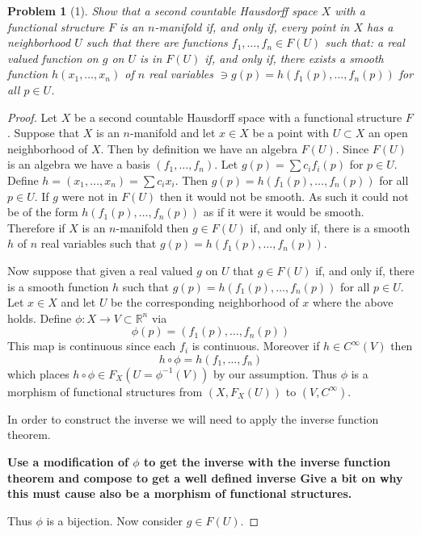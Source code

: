 \documentclass[10pt]{article}
\newcommand{\bb}[1]{\mathbb{#1}}
\theoremstyle{plain}
\newtheorem{problem}{Problem}
\theoremstyle{remark}
\begin{document}
\begin{problem}[1]
  Show that a second countable Hausdorff space $X$ with a functional
  structure $F$ is an $n$-manifold if, and only if, every point in
  $X$ has a neighborhood $U$ such that there are functions
  $f_1,\ldots,f_n\in F(U)$ such that: a real valued function on $g$
  on $U$ is in $F(U)$ if, and only if, there exists a smooth function
  $h(x_1,\ldots,x_n)$ of $n$ real variables $\ni g(p)=h(f_1(p),\ldots,f_n(p))$
  for all $p\in U$.
\end{problem}

\begin{proof}
  Let $X$ be a second countable Hausdorff space with a functional
  structure $F$. Suppose that $X$ is an $n$-manifold and let
  $x\in X$ be a point with $U\subset X$ an open neighborhood of $X$.
  Then by definition we have an algebra $F(U)$. Since $F(U)$
  is an algebra we have a basis $(f_1,\ldots,f_n)$. Let
  $g(p)=\sum c_if_i(p)$ for $p\in U$. Define $h=(x_1,\ldots,x_n)=\sum c_ix_i$.
  Then $g(p)=h(f_1(p),\ldots,f_n(p))$ for all $p\in U$. If $g$ were
  not in $F(U)$ then it would not be smooth. As such it could
  not be of the form $h(f_1(p),\ldots,f_n(p))$ as if it were it
  would be smooth. Therefore if $X$ is an $n$-manifold
  then $g\in F(U)$ if, and only if, there is a smooth $h$ of $n$ real
  variables such that $g(p)=h(f_1(p),\ldots,f_n(p))$. 

  Now suppose that given a real valued $g$ on $U$ that $g\in F(U)$
  if, and only if, there is a smooth function $h$ such that
  $g(p)=h(f_1(p),\ldots,f_n(p))$ for all $p\in U$. Let $x\in X$ and
  let $U$ be the corresponding neighborhood of $x$ where the
  above holds. Define $\phi:X\rightarrow V\subset\bb{R}^n$ via
  \[\phi(p)=(f_1(p),\ldots,f_n(p)) \]
  This map is continuous since each $f_i$ is continuous. Moreover
  if $h\in C^\infty(V)$ then
  \[ h\circ \phi=h(f_1,\ldots,f_n)\]
  which places $h\circ \phi\in F_X(U=\phi^{-1}(V))$ by our assumption. Thus
  $\phi$ is a morphism of functional structures from $(X,F_X(U))$
  to $(V,C^\infty)$.

  In order to construct the inverse we will need to apply the
  inverse function theorem.

  \textbf{Use a modification of $\phi$ to get the inverse with the
    inverse function theorem and compose to get a well defined inverse
    Give a bit on why this must cause also be a morphism of functional
    structures.}

  Thus $\phi$ is a bijection. Now consider $g\in F(U)$.


\end{proof}
\end{document}
